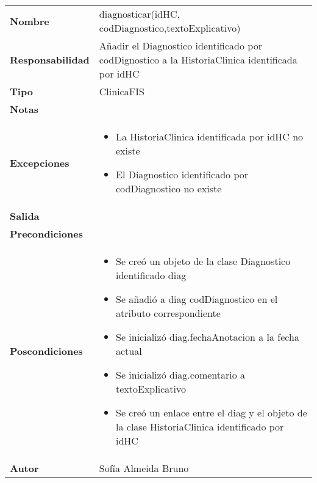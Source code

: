 \documentclass[11pt,a4paper]{article}
\newenvironment{itemizenomargins}
    {\begin{minipage}[t]{1\linewidth}\begin{itemize}}
    {\end{itemize}\end{minipage}}
\begin{document}
\begin{table}[H]
\centering
\label{my-label}
\begin{tabularx}{\textwidth}{l|X}
\textbf{Nombre}          & diagnosticar(idHC, codDiagnostico,textoExplicativo) \\
\textbf{Responsabilidad} & Añadir el Diagnostico identificado por codDignostico a la HistoriaClinica identificada por idHC\\
\textbf{Tipo}            & ClinicaFIS \\
\textbf{Notas}           &  \\
\textbf{Excepciones}     & 
\begin{itemizenomargins}
\item La HistoriaClinica identificada por idHC no existe
\item El Diagnostico identificado por codDiagnostico no existe
\end{itemizenomargins}\\
\textbf{Salida}          &  \\
\textbf{Precondiciones}  &  \\
\textbf{Poscondiciones}  &
\begin{itemizenomargins}
\item Se creó un objeto de la clase Diagnostico identificado diag
\item Se añadió a diag codDiagnostico en el atributo correspondiente
\item Se inicializó diag.fechaAnotacion a la fecha actual
\item Se inicializó diag.comentario a textoExplicativo
\item Se creó un enlace entre el diag y el objeto de la clase HistoriaClinica identificado por idHC
\end{itemizenomargins}\\
\textbf{Autor}           & Sofía Almeida Bruno
\end{tabularx}
\end{table}
\end{document}
